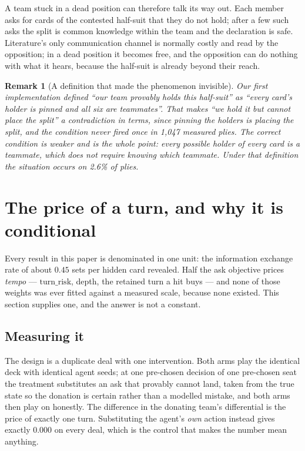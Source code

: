 \documentclass[11pt,a4paper]{article}
\newtheorem{remark}{Remark}
\begin{document}
A team stuck in a dead position can therefore talk its way out. Each member asks
for cards of the contested half-suit that they do not hold; after a few such
asks the split is common knowledge within the team and the declaration is safe.
Literature's only communication channel is normally costly and read by the
opposition; in a dead position it becomes free, and the opposition can do
nothing with what it hears, because the half-suit is already beyond their reach.

\begin{remark}[A definition that made the phenomenon invisible]
Our first implementation defined ``our team provably holds this half-suit'' as
``every card's holder is pinned and all six are teammates''. That makes ``we hold
it but cannot place the split'' a contradiction in terms, since pinning the
holders \emph{is} placing the split, and the condition never fired once in 1,047
measured plies. The correct condition is weaker and is the whole point: every
\emph{possible} holder of every card is a teammate, which does not require
knowing which teammate. Under that definition the situation occurs on 2.6\% of
plies.
\end{remark}

\section{The price of a turn, and why it is conditional}
\label{sec:tempo}

Every result in this paper is denominated in one unit: the information exchange
rate of about $0.45$ sets per hidden card revealed. Half the ask objective
prices \emph{tempo} --- $\mathrm{turn\_risk}$, depth, the retained turn a hit
buys --- and none of those weights was ever fitted against a measured scale,
because none existed. This section supplies one, and the answer is not a
constant.

\subsection{Measuring it}

The design is a duplicate deal with one intervention. Both arms play the
identical deck with identical agent seeds; at one pre-chosen decision of one
pre-chosen seat the treatment substitutes an ask that provably cannot land,
taken from the true state so the donation is certain rather than a modelled
mistake, and both arms then play on honestly. The difference in the donating
team's differential is the price of exactly one turn. Substituting the agent's
\emph{own} action instead gives exactly $0.000$ on every deal, which is the
control that makes the number mean anything.
\end{document}
